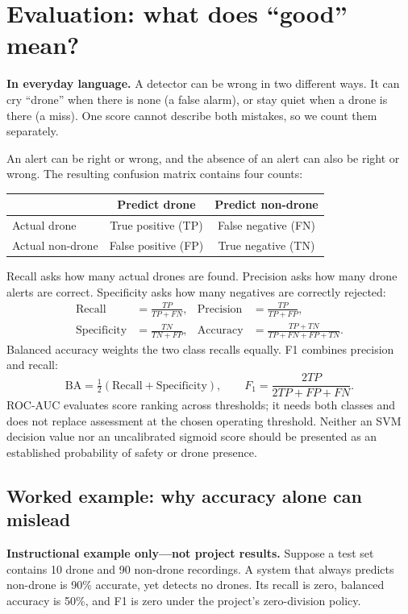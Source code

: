 \documentclass[11pt,letterpaper]{article}
\newcommand{\plain}[1]{\par\smallskip\noindent\textbf{In everyday language.} #1\par\smallskip}
\begin{document}
\section{Evaluation: what does ``good'' mean?}
\label{sec:metrics}
\plain{A detector can be wrong in two different ways. It can cry ``drone''
when there is none (a false alarm), or stay quiet when a drone is there (a
miss). One score cannot describe both mistakes, so we count them separately.}

An alert can be right or wrong, and the absence of an alert can also be right
or wrong. The resulting confusion matrix contains four counts:
\begin{center}
\begin{tabular}{@{}lcc@{}}
\toprule
 & Predict drone & Predict non-drone \\
\midrule
Actual drone & True positive (TP) & False negative (FN) \\
Actual non-drone & False positive (FP) & True negative (TN) \\
\bottomrule
\end{tabular}
\end{center}
Recall asks how many actual drones are found. Precision asks how many drone
alerts are correct. Specificity asks how many negatives are correctly rejected:
\begin{align}
 \mathrm{Recall}&=\frac{TP}{TP+FN},&
 \mathrm{Precision}&=\frac{TP}{TP+FP},\\
 \mathrm{Specificity}&=\frac{TN}{TN+FP},&
 \mathrm{Accuracy}&=\frac{TP+TN}{TP+FN+FP+TN}.
\end{align}
Balanced accuracy weights the two class recalls equally. F1 combines precision
and recall:
\begin{equation}
 \mathrm{BA}=\tfrac12(\mathrm{Recall}+\mathrm{Specificity}),\qquad
 F_1=\frac{2TP}{2TP+FP+FN}.
\end{equation}
ROC-AUC evaluates score ranking across thresholds; it needs both classes and
does not replace assessment at the chosen operating threshold. Neither an
SVM decision value nor an uncalibrated sigmoid score should be presented as
an established probability of safety or drone presence.

\subsection{Worked example: why accuracy alone can mislead}
\textbf{Instructional example only---not project results.} Suppose a test set
contains 10 drone and 90 non-drone recordings. A system that always predicts
non-drone is 90\% accurate, yet detects no drones. Its recall is zero,
balanced accuracy is 50\%, and F1 is zero under the project's zero-division policy.
\end{document}

